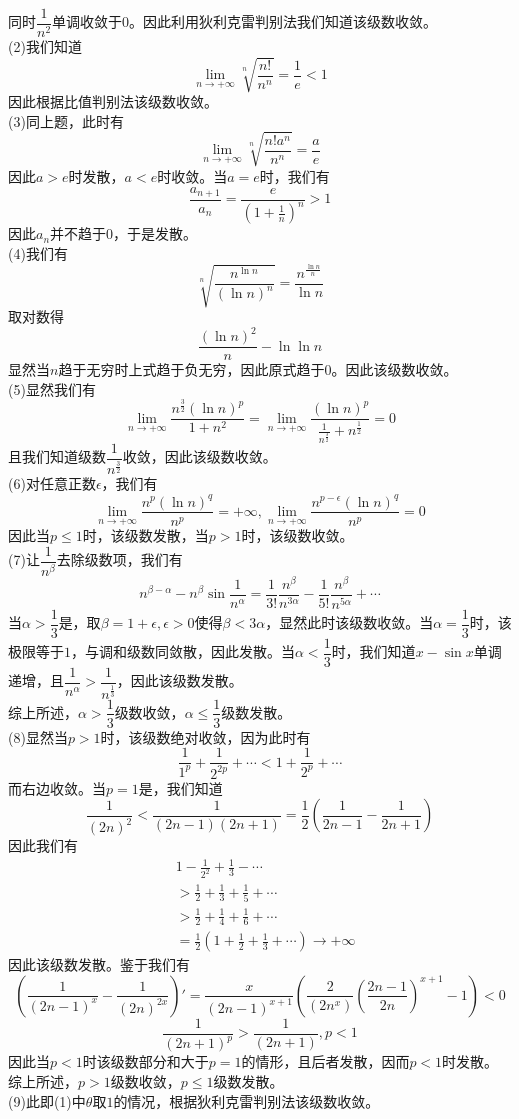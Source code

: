 \documentclass[utf8]{ctexart}
\begin{document}
同时$\dfrac{1}{n^2}$单调收敛于$0$。因此利用狄利克雷判别法我们知道该级数收敛。\\
(2)我们知道
\[\lim_{n\rightarrow+\infty}\sqrt[n]{\frac{n!}{n^n}}=\frac{1}{e}<1\]
因此根据比值判别法该级数收敛。\\
(3)同上题，此时有
\[\lim_{n\rightarrow+\infty}\sqrt[n]{\frac{n!a^n}{n^n}}=\frac{a}{e}\]
因此$a>e$时发散，$a<e$时收敛。当$a=e$时，我们有
\[\frac{a_{n+1}}{a_n}=\frac{e}{(1+\frac{1}{n})^n}>1\]
因此$a_n$并不趋于$0$，于是发散。\\
(4)我们有
\[\sqrt[n]{\frac{n^{\ln n}}{(\ln n)^n}}=\frac{n^{\frac{\ln n}{n}}}{\ln n}\]
取对数得
\[\frac{(\ln n)^2}{n}-\ln\ln n\]
显然当$n$趋于无穷时上式趋于负无穷，因此原式趋于$0$。因此该级数收敛。\\
(5)显然我们有
\[\lim_{n\rightarrow+\infty}\frac{n^{\frac{3}{2}}(\ln n)^p}{1+n^2}=\lim_{n\rightarrow+\infty}\frac{(\ln n)^p}{\frac{1}{n^\frac{3}{2}}+n^\frac{1}{2}}=0\]
且我们知道级数$\dfrac{1}{n^\frac{3}{2}}$收敛，因此该级数收敛。\\
(6)对任意正数$\epsilon$，我们有
\[\lim_{n\rightarrow+\infty}\frac{n^p(\ln n)^q}{n^p}=+\infty,\lim_{n\rightarrow+\infty}\frac{n^{p-\epsilon}(\ln n)^q}{n^p}=0\]
因此当$p\le1$时，该级数发散，当$p>1$时，该级数收敛。\\
(7)让$\dfrac{1}{n^\beta}$去除级数项，我们有
\[n^{\beta-\alpha}-n^\beta\sin\frac{1}{n^\alpha}=\frac{1}{3!}\frac{n^\beta}{n^{3\alpha}}-\frac{1}{5!}\frac{n^\beta}{n^{5\alpha}}+\cdots\]
当$\alpha>\dfrac{1}{3}$是，取$\beta=1+\epsilon,\epsilon>0$使得$\beta<3\alpha$，显然此时该级数收敛。当$\alpha=\dfrac{1}{3}$时，该极限等于$1$，与调和级数同敛散，因此发散。当$\alpha
<\dfrac{1}{3}$时，我们知道$x-\sin x$单调递增，且$\dfrac{1}{n^\alpha}>\dfrac{1}{n^\frac{1}{3}}$，因此该级数发散。\\
综上所述，$\alpha>\dfrac{1}{3}$级数收敛，$\alpha\le\dfrac{1}{3}$级数发散。\\
(8)显然当$p>1$时，该级数绝对收敛，因为此时有
\[\frac{1}{1^p}+\frac{1}{2^{2p}}+\cdots<1+\frac{1}{2^p}+\cdots\]
而右边收敛。当$p=1$是，我们知道
\[\frac{1}{(2n)^2}<\frac{1}{(2n-1)(2n+1)}=\frac{1}{2}(\frac{1}{2n-1}-\frac{1}{2n+1})\]
因此我们有
\begin{align*}
	&1-\frac{1}{2^2}+\frac{1}{3}-\cdots\\
	&>\frac{1}{2}+\frac{1}{3}+\frac{1}{5}+\cdots\\
	&>\frac{1}{2}+\frac{1}{4}+\frac{1}{6}+\cdots\\
	&=\frac{1}{2}(1+\frac{1}{2}+\frac{1}{3}+\cdots)\rightarrow+\infty
\end{align*}
因此该级数发散。鉴于我们有
\[(\frac{1}{(2n-1)^x}-\frac{1}{(2n)^{2x}})'=\frac{x}{(2n-1)^{x+1}}(\frac{2}{(2n^x)}(\frac{2n-1}{2n})^{x+1}-1)<0\]
\[\frac{1}{(2n+1)^p}>\frac{1}{(2n+1)},p<1\]
因此当$p<1$时该级数部分和大于$p=1$的情形，且后者发散，因而$p<1$时发散。\\
综上所述，$p>1$级数收敛，$p\le1$级数发散。\\
(9)此即(1)中$\theta$取$1$的情况，根据狄利克雷判别法该级数收敛。
\end{document}
